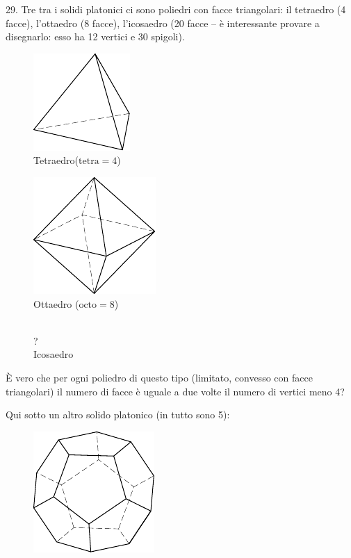 \begin{problem}{29.}
	Tre tra i solidi platonici ci sono poliedri con facce triangolari: il tetraedro (4 facce), l’ottaedro (8 facce), l’icosaedro (20 facce -- è interessante provare a disegnarlo: esso ha 12 vertici e 30 spigoli).
	\begin{figure}
		\footnotesize
		\null\hfill
		\parbox{0.3\linewidth}{\centering\includegraphics{resources/taskbook-131}\\Tetraedro($\text{tetra}= 4$)}
		\hfill
		\parbox{0.3\linewidth}{\centering\includegraphics{resources/taskbook-132}\\Ottaedro ($\text{octo}= 8$)}
		\hfill\null\\
		{\Huge ?}\\Icosaedro
	\end{figure}
	È vero che per ogni poliedro di questo tipo (limitato, convesso con facce triangolari) il numero di facce è uguale a due volte il numero di vertici meno 4?


	Qui sotto un altro solido platonico (in tutto sono 5):
	\begin{figure}
		\includegraphics{resources/taskbook-14}
	\end{figure}
\end{problem}

